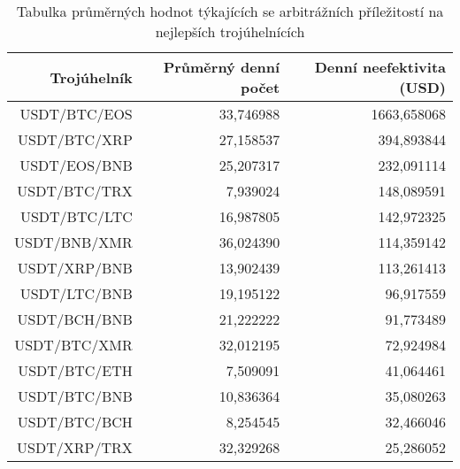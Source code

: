 \begin{table}\centering
\caption{Tabulka průměrných hodnot týkajících se arbitrážních příležitostí na nejlepších trojúhelnících}
\label{table_combined_best}
\begin{tabular}{|| r | r | r ||}\hline Trojúhelník & Průměrný denní počet & Denní neefektivita (USD)\\ [0.5ex]
 \hline\hline USDT/BTC/EOS & 33,746988 & 1663,658068\\ 
 \hline USDT/BTC/XRP & 27,158537 & 394,893844\\ 
 \hline USDT/EOS/BNB & 25,207317 & 232,091114\\ 
 \hline USDT/BTC/TRX & 7,939024 & 148,089591\\ 
 \hline USDT/BTC/LTC & 16,987805 & 142,972325\\ 
 \hline USDT/BNB/XMR & 36,024390 & 114,359142\\ 
 \hline USDT/XRP/BNB & 13,902439 & 113,261413\\ 
 \hline USDT/LTC/BNB & 19,195122 & 96,917559\\ 
 \hline USDT/BCH/BNB & 21,222222 & 91,773489\\ 
 \hline USDT/BTC/XMR & 32,012195 & 72,924984\\ 
 \hline USDT/BTC/ETH & 7,509091 & 41,064461\\ 
 \hline USDT/BTC/BNB & 10,836364 & 35,080263\\ 
 \hline USDT/BTC/BCH & 8,254545 & 32,466046\\ 
 \hline USDT/XRP/TRX & 32,329268 & 25,286052\\ 
 \hline
\end{tabular}
\end{table}